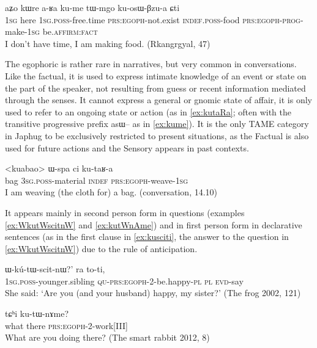 \documentclass[oldfontcommands,oneside,a4paper,11pt]{article}
\newcommand{\ipa}[1]{{\phon \mbox{#1}}} %
\newcommand{\factual}[1]{\textsc{:fact}}
\begin{document}
\begin{exe}
\ex \label{ex:kume}
\gll 
\ipa{aʑo}  	\ipa{kɯre}  	\ipa{a-ʁa}  	\ipa{ku-me}  \ipa{tɯ-mgo} 	\ipa{ku-osɯ-βzu-a} 	\ipa{ɕti} 	  	\\
\textsc{1sg} here \textsc{1sg.poss}-free.time \textsc{prs:egoph}-not.exist \textsc{indef.poss}-food \textsc{prs:egoph}-\textsc{prog}-make-\textsc{1sg} be.\textsc{affirm}\factual{}  \\
\glt I don't have time, I am making food.  (Rkangrgyal, 47)
\end{exe}

The egophoric  is rather rare in narratives, but very common in conversations. Like the factual, it is used to express intimate knowledge of an event or state on the part of the speaker, not resulting from guess or recent information mediated through the senses. It cannot express a general or gnomic state of affair, it is only used to refer to an ongoing state or action (as in \ref{ex:kutaRa}; often with the transitive progressive prefix \ipa{asɯ--} as in \ref{ex:kume}). It is the only TAME category in Japhug to be exclusively restricted to present situations, as the Factual is also used for future actions and the Sensory appears in past contexts.

\begin{exe}
\ex \label{ex:kutaRa}
\gll 
<kuabao> 	\ipa{ɯ-spa}  	\ipa{ci}  	\ipa{ku-taʁ-a}  \\
bag \textsc{3sg.poss}-material \textsc{indef} \textsc{prs:egoph}-weave-\textsc{1sg} \\
\glt I am weaving (the cloth for) a bag. (conversation, 14.10)
\end{exe}


It appears mainly  in second person form in questions (examples \ref{ex:WkutWscitnW} and \ref{ex:kutWnAme}) and in first person form in declarative sentences (as in the first clause in \ref{ex:kusciti}, the answer to the question in \ref{ex:WkutWscitnW}) due to the rule of anticipation.

\begin{exe}
\ex \label{ex:WkutWscitnW}
\gll  \ipa{`a-ʁi} 			\ipa{ɯ-kú-tɯ-scit-nɯ?}' 	\ipa{ra} 	\ipa{to-ti,} \\
\textsc{1sg.poss}-younger.sibling  \textsc{qu-prs:egoph}-2-be.happy-\textsc{pl} \textsc{pl} \textsc{evd}-say \\
\glt She said: `Are you (and your husband) happy, my sister?' (The frog 2002, 121)
\end{exe}

\begin{exe}
\ex \label{ex:kutWnAme}
\gll \ipa{nɯtɕu}  \ipa{tɕʰi} \ipa{ku-tɯ-nɤme?}\\
what there \textsc{prs:egoph}-2-work[III] \\
\glt What are you doing there? (The smart rabbit 2012, 8)
\end{exe}
 
\end{document}
